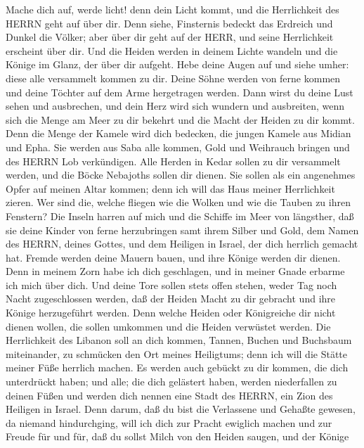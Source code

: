  Mache dich auf, werde licht! denn dein Licht kommt, und die
Herrlichkeit des HERRN geht auf über dir.  Denn siehe,
Finsternis bedeckt das Erdreich und Dunkel die Völker; aber über dir
geht auf der HERR, und seine Herrlichkeit erscheint über dir.
 Und die Heiden werden in deinem Lichte wandeln und die
Könige im Glanz, der über dir aufgeht.  Hebe deine Augen auf
und siehe umher: diese alle versammelt kommen zu dir. Deine Söhne werden
von ferne kommen und deine Töchter auf dem Arme hergetragen werden.
 Dann wirst du deine Lust sehen und ausbrechen, und dein
Herz wird sich wundern und ausbreiten, wenn sich die Menge am Meer zu
dir bekehrt und die Macht der Heiden zu dir kommt.  Denn die
Menge der Kamele wird dich bedecken, die jungen Kamele aus Midian und
Epha. Sie werden aus Saba alle kommen, Gold und Weihrauch bringen und
des HERRN Lob verkündigen.  Alle Herden in Kedar sollen zu
dir versammelt werden, und die Böcke Nebajoths sollen dir dienen. Sie
sollen als ein angenehmes Opfer auf meinen Altar kommen; denn ich will
das Haus meiner Herrlichkeit zieren.  Wer sind die, welche
fliegen wie die Wolken und wie die Tauben zu ihren Fenstern?
 Die Inseln harren auf mich und die Schiffe im Meer von
längsther, daß sie deine Kinder von ferne herzubringen samt ihrem Silber
und Gold, dem Namen des HERRN, deines Gottes, und dem Heiligen in
Israel, der dich herrlich gemacht hat.  Fremde werden deine
Mauern bauen, und ihre Könige werden dir dienen. Denn in meinem Zorn
habe ich dich geschlagen, und in meiner Gnade erbarme ich mich über
dich.  Und deine Tore sollen stets offen stehen, weder Tag
noch Nacht zugeschlossen werden, daß der Heiden Macht zu dir gebracht
und ihre Könige herzugeführt werden.  Denn welche Heiden
oder Königreiche dir nicht dienen wollen, die sollen umkommen und die
Heiden verwüstet werden.  Die Herrlichkeit des Libanon soll
an dich kommen, Tannen, Buchen und Buchsbaum miteinander, zu schmücken
den Ort meines Heiligtums; denn ich will die Stätte meiner Füße herrlich
machen.  Es werden auch gebückt zu dir kommen, die dich
unterdrückt haben; und alle; die dich gelästert haben, werden
niederfallen zu deinen Füßen und werden dich nennen eine Stadt des
HERRN, ein Zion des Heiligen in Israel.  Denn darum, daß du
bist die Verlassene und Gehaßte gewesen, da niemand hindurchging, will
ich dich zur Pracht ewiglich machen und zur Freude für und für,
 daß du sollst Milch von den Heiden saugen, und der Könige
